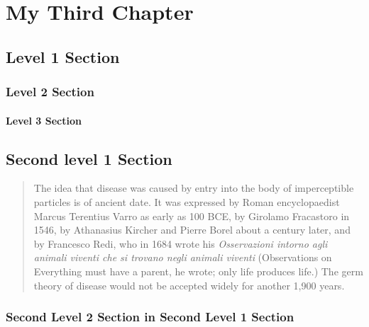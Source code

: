 \chapter{My Third Chapter}	%

\blindtext

\section{Level 1 Section}
\blindtext
\parencite{Silberschatz2007}

\subsection{Level 2 Section}
\blindtext


\subsubsection{Level 3 Section}
\blindtext[3]


\section{Second level 1 Section}
\blindtext
\begin{quote}
	The idea that disease was caused by entry into the body of imperceptible particles is of ancient date. It was expressed by Roman encyclopaedist Marcus Terentius Varro as early as 100 BCE, by Girolamo Fracastoro in 1546, by Athanasius Kircher and Pierre Borel about a century later, and by Francesco Redi, who in 1684 wrote his \textit{Osservazioni intorno agli animali viventi che si trovano negli animali viventi} (Observations on Everything must have a parent, he wrote; only life produces life.) The germ theory of disease would not be accepted widely for another 1,900 years.
\end{quote}

\subsection{Second Level 2 Section in Second Level 1 Section}
\blindtext

\endinput